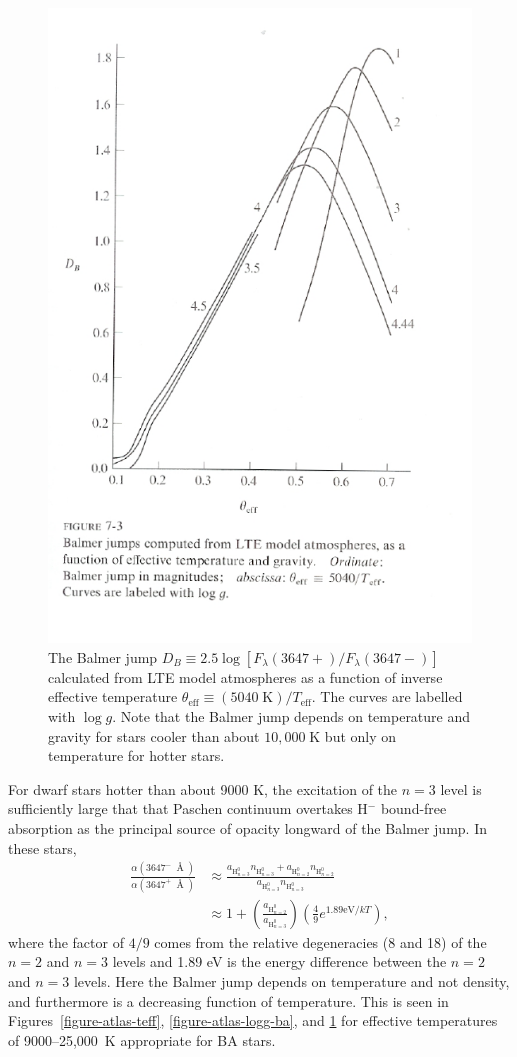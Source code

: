 \begin{figure}
\centering
\includegraphics[width=0.8\linewidth]{figures/balmer-jump.pdf}
\caption{The Balmer jump $D_B \equiv 2.5 \log [F_\lambda(3647+)/F_\lambda(3647-)]$ calculated from LTE model atmospheres as a function of inverse effective temperature $\theta_\mathrm{eff} \equiv (5040\;\mathrm{K})/T_\mathrm{eff}$. The curves are labelled with $\log g$. Note that the Balmer jump depends on temperature and gravity for stars cooler than about $10,000\;\mathrm{K}$ but only on temperature for hotter stars.}
\label{figure-balmer-jump}
\end{figure}

For dwarf stars hotter than about 9000 K, the excitation of
the $n=3$ level is sufficiently large that that Paschen
continuum overtakes H$^-$ bound-free absorption as the
principal source of opacity longward of the Balmer jump. In
these stars,
\begin{align}
\frac{\alpha(3647^-\:{\Angstrom})}{\alpha(3647^+\:{\Angstrom})}
&\approx
\frac
{a_{\mathrm{H}^0_{n=3}} n_{\mathrm{H}^0_{n=3}} + a_{\mathrm{H}^0_{n=2}} n_{\mathrm{H}^0_{n=2}}}
{a_{\mathrm{H}^0_{n=3}} n_{\mathrm{H}^0_{n=3}}}\\
&\approx
1 + \left(
\frac
{a_{\mathrm{H}^0_{n=2}}}{a_{\mathrm{H}^0_{n=3}}}
\right)
\left(\frac{4}{9}e^{1.89\mathrm{eV}/kT}\right),
\end{align}
where the factor of $4/9$ comes from the relative
degeneracies (8 and 18) of the $n=2$ and $n=3$ levels and
1.89 eV is the energy difference between the $n=2$ and $n=3$
levels. Here the Balmer jump depends on temperature and not
density, and furthermore is a decreasing function of
temperature. This is seen in Figures~\ref{figure-atlas-teff}, \ref{figure-atlas-logg-ba}, and \ref{figure-balmer-jump} for effective temperatures of 9000--25,000~K appropriate for BA stars.


